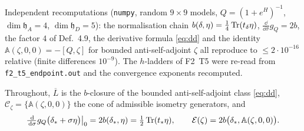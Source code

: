 \documentclass[11pt]{article}
\newcommand{\hh}{\mathfrak h}
\newcommand{\Aop}{\mathbb A}
\begin{document}
Independent recomputations (\texttt{numpy}, random $9\times9$ models,
$Q=(1+e^{H})^{-1}$, $\dim\hh_A=4$, $\dim\hh_D=5$): the normalisation chain
$b(\delta,\eta)=\frac14\operatorname{Tr}(t_\delta\eta)$, $\frac{\dd}{\dd\sigma}g_Q=2b$, the factor $4$ of
Def.~4.9, the derivative formula \eqref{eq:dd} and the identity
$\Aop(\zeta,0,0)=-[Q,\zeta]$ for bounded anti-self-adjoint $\zeta$ all reproduce to
$\le2\cdot10^{-16}$ relative (finite differences $10^{-9}$).  The $h$-ladders of F2~T5 were
re-read from \texttt{f2\_t5\_endpoint.out} and the convergence exponents recomputed.

Throughout, $\overline L$ is the $b$-closure of the bounded anti-self-adjoint class
\eqref{eq:dd}, $\mathcal C_\zeta=\{\Aop(\zeta,0,0)\}$ the cone of admissible isometry
generators, and
\begin{equation}\label{eq:dd}
 \tfrac{\dd}{\dd\sigma}g_Q\bigl(\delta_*+\sigma\eta\bigr)\big|_{0}=2b(\delta_*,\eta)
 =\tfrac12\Tr(t_*\eta),\qquad
 \mathcal E(\zeta)=2b\bigl(\delta_*,\Aop(\zeta,0,0)\bigr) .
\end{equation}
\end{document}
